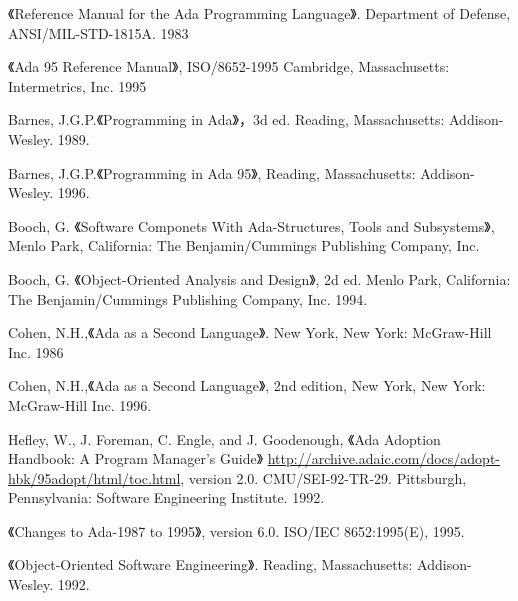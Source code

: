 %
%
%

\cleardoublepage
{}
\begin{thebibliography}{widest-label}\label{bib}

 《Reference Manual for the Ada Programming
Language》. Department of Defense, ANSI/MIL-STD-1815A. 1983

 《Ada 95 Reference Manual》,
ISO/8652-1995 Cambridge, Massachusetts: Intermetrics, Inc. 1995

 Barnes, J.G.P.《Programming in Ada》，3d ed.
Reading, Massachusetts: Addison-Wesley. 1989.

 Barnes, J.G.P.《Programming in Ada 95》,
Reading, Massachusetts: Addison-Wesley. 1996.

 Booch, G. 《Software Componets With Ada-Structures, Tools and Subsystems》,
Menlo Park, California: The Benjamin/Cummings Publishing Company, Inc.

 Booch, G. 《Object-Oriented Analysis and
Design》, 2d ed. Menlo Park, California: The Benjamin/Cummings Publishing
Company, Inc. 1994.

 Cohen, N.H.,《Ada as a Second Language》.
 New York, New York: McGraw-Hill Inc. 1986

 Cohen, N.H.,《Ada as a Second Language》,
2nd edition, New York, New York: McGraw-Hill Inc. 1996.

 Hefley, W., J. Foreman, C. Engle, and
J. Goodenough, 《Ada Adoption Handbook: A Program Manager's Guide》
\url{http://archive.adaic.com/docs/adopt-hbk/95adopt/html/toc.html},
version 2.0. CMU/SEI-92-TR-29. Pittsburgh, Pennsylvania:
Software Engineering Institute. 1992.

 《Changes to Ada-1987 to 1995》,
version 6.0. ISO/IEC 8652:1995(E), 1995.

 《Object-Oriented Software
Engineering》. Reading, Massachusetts: Addison-Wesley. 1992.



\end{thebibliography}
